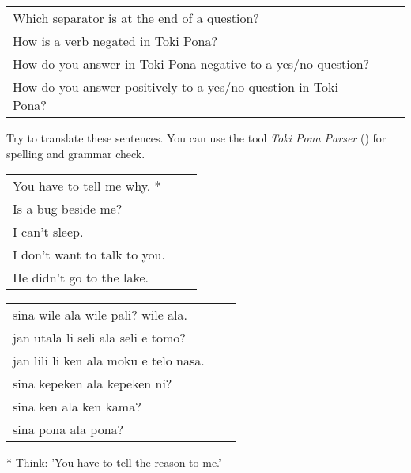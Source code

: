 \begin{supertabular}{p{5,5cm}|ll}
    Which separator is at the end of a question?                    &  & \\ %
    How is a verb negated in Toki Pona?                             &  & \\ %
    How do you answer in Toki Pona negative to a yes/no question?   &  & \\ %
    How do you answer positively to a yes/no question in Toki Pona? &  & \\ %
\end{supertabular}

Try to translate these sentences.
You can use the tool \textit{Toki Pona Parser} (\cite{www:rowa:02}) for spelling and grammar check.

\begin{supertabular}{p{5,5cm}|ll}
    You have to tell me why. *   &  & \\ %
    Is a bug beside me?          &  & \\ %
    I can't sleep.               &  & \\ %
    I don't want to talk to you. &  & \\ %
    He didn't go to the lake.    &  & \\ %
\end{supertabular}

\begin{supertabular}{p{5,5cm}|ll}
    sina wile ala wile pali? wile ala.    &  & \\ %
    jan utala li seli ala seli e tomo?    &  & \\ %
    jan lili li ken ala moku e telo nasa. &  & \\ %
    sina kepeken ala kepeken ni?          &  & \\ %
    sina ken ala ken kama?                &  & \\ %
    sina pona ala pona?                   &  & \\ %
\end{supertabular}

* Think: 'You have to tell the reason to me.'
